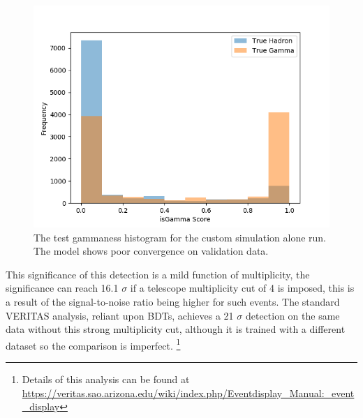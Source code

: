 \begin{figure}[] 
        \centering \includegraphics[width=\columnwidth]{figures/crabrun2_hist.png}

        \caption{
                \label{fig:cr2_hist} The test gammaness histogram for the custom simulation alone run. The model shows poor convergence on validation data.
        }
\end{figure}
\begin{table}[h]
    \centering
    \caption{Anasum output for the opt4 run, without applying a strenuous multiplicity cut.}
    \label{table:opt4}
\end{table}

This significance of this detection is a mild function of multiplicity, the significance can reach 16.1 $\sigma$ if a telescope multiplicity cut of 4 is imposed, this is a result of the signal-to-noise ratio being higher for such events. The standard VERITAS analysis, reliant upon BDTs, achieves a 21 $\sigma$ detection on the same data without this strong multiplicity cut, although it is trained with a different dataset so the comparison is imperfect. \footnote{Details of this analysis can be found at \url{https://veritas.sao.arizona.edu/wiki/index.php/Eventdisplay_Manual:_event_display}}

